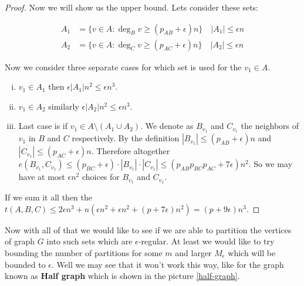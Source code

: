 \begin{proof}
	Now we will show us the upper bound. Lets consider these sets:
	
	$$
	\begin{aligned}
		A_1 &= \{ v \in A : \deg_B v \geq (p_{AB} + \epsilon) n\} \quad |A_1| \leq \epsilon n \\
		A_2 &= \{ v \in A : \deg_C v \geq (p_{AC} + \epsilon) n\} \quad |A_2| \leq \epsilon n
	\end{aligned}
	$$
	
	Now we consider three separate cases for which set is used for the $v_1 \in A$.
	
	\begin{enumerate}[(i)]
		\item $v_1 \in A_1$ then $\epsilon |A_1| n^2 \leq \epsilon n^3$.
		\item $v_1 \in A_2$ similarly $\epsilon |A_2| n^2 \leq \epsilon n^3$.
		\item Last case is if $v_1 \in A \setminus (A_1 \cup A_2)$. We denote as $B_{v_1}$ and $C_{v_1}$ the neighbors of $v_1$ in $B$ and $C$ respectively. By the definition $|B_{v_1}| \leq (p_{AB} + \epsilon) n$ and  $|C_{v_1}| \leq (p_{AC} + \epsilon) n$. Therefore altogether $e(B_{v_1}, C_{v_1}) \leq (p_{BC} +\epsilon) \cdot |B_{v_1}| \cdot |C_{v_1}| \leq (p_{AB} p_{BC} p_{AC} + 7\epsilon) n^2$. So we may have at most $\epsilon n^2$ choices for $B_{v_1}$ and $C_{v_1}$.
	\end{enumerate}
	
	If we sum it all then the $t(A,B,C) \leq 2\epsilon n^3 + n (\epsilon n^2 + \epsilon n^2 + (p  + 7\epsilon)n^2) = (p + 9 \epsilon)n^3$.
\end{proof}

Now with all of that we would like to see if we are able to partition the vertices of graph $G$ into such sets which are $\epsilon$-regular. At least we would like to try bounding the number of partitions for some $m$ and larger $M_\epsilon$ which will be bounded to $\epsilon$. Well we may see that it won't work this way, like for the graph known as \textbf{Half graph} which is shown in the picture \ref{half-graph}.

